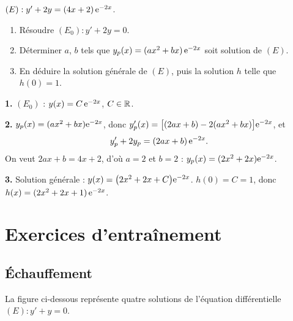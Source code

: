 \exerciceresolu
$(E):y'+2y=(4x+2)\,\mathrm{e}^{-2x}$.
\begin{enumerate}
	\item Résoudre $(E_0):y'+2y=0$.
	\item Déterminer $a$, $b$ tels que $y_p(x)=(a x^{2}+bx)\,\mathrm{e}^{-2x}$ soit
	solution de $(E)$.
	\item En déduire la solution générale de $(E)$, puis la solution $h$
	telle que $h(0)=1$.
\end{enumerate}

\solution

\textbf{1.} $(E_0)$ : $y(x)=C\,\mathrm{e}^{-2x}$, $C\in\mathbb{R}$.

\textbf{2.} $y_p(x)=(a x^{2}+bx)\mathrm{e}^{-2x}$, donc
$y_p'(x)=\bigl[(2ax+b)-2(a x^{2}+bx)\bigr]\mathrm{e}^{-2x}$, et
\[
y_p'+2y_p=(2a x+b)\,\mathrm{e}^{-2x}.
\]
On veut $2a x+b=4x+2$, d'où $a=2$ et $b=2$ :
$y_p(x)=(2x^{2}+2x)\mathrm{e}^{-2x}$.

\textbf{3.} Solution générale : $y(x)=\bigl(2x^{2}+2x+C\bigr)\mathrm{e}^{-2x}$.
$h(0)=C=1$, donc $h(x)=(2x^{2}+2x+1)\,\mathrm{e}^{-2x}$.


\section{Exercices d'entraînement}

\subsection{Échauffement}

La figure ci-dessous représente quatre solutions de l'équation
différentielle $(E):y'+y=0$.

\begin{center}
\end{center}

